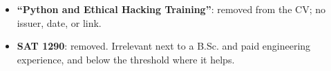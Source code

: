 \documentclass[10pt,a4paper]{article}
\begin{document}
\begin{itemize}
    \item \textbf{``Python and Ethical Hacking Training''}: removed from the
    CV; no issuer, date, or link.

    \item \textbf{SAT 1290}: removed. Irrelevant next to a B.Sc. and paid
    engineering experience, and below the threshold where it helps.
\end{itemize}

\end{document}
